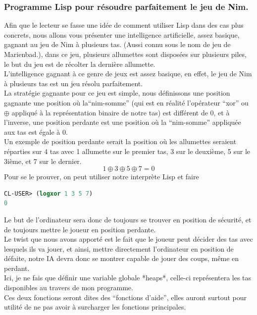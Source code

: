 \documentclass[a4paper, 12pt]{article}
\numberwithin{equation}{subsection}
\begin{document}
\subsubsection{Programme Lisp pour résoudre parfaitement le jeu de Nim.}
Afin que le lecteur se fasse une idée de comment utiliser Lisp dans des cas plus concrets, nous allons vous présenter une intelligence artificielle, assez basique, gagnant au jeu de Nim à plusieurs tas. (Aussi connu sous le nom de jeu de Marienbad.), dans ce jeu, plusieurs allumettes sont disposées sur plusieurs piles, le but du jeu est de récolter la dernière allumette. \\
L'intelligence gagnant à ce genre de jeux est assez basique, en effet, le jeu de Nim à plusieurs tas est un jeu résolu parfaitement. \\
La stratégie gagnante pour ce jeu est simple, nous définissons une position gagnante une position où la``nim-somme'' (qui est en réalité l'opérateur ``xor'' ou $\oplus$ appliqué à la représentation binaire de notre tas) est différent de 0, et à l'inverse, une position perdante est une position où la ``nim-somme'' appliquée aux tas est égale à 0. \\
Un exemple de position perdante serait la position où les allumettes seraient réparties sur 4 tas avec 1 allumette sur le premier tas, 3 sur le deuxième, 5 sur le 3ième, et 7 sur le dernier. \\
$$1 \oplus 3 \oplus 5 \oplus 7 = 0$$
Pour se le prouver, on peut utiliser notre interprète Lisp et faire
\begin{lstlisting}[language=Lisp]
CL-USER> (logxor 1 3 5 7)
0
\end{lstlisting}
Le but de l'ordinateur sera donc de toujours se trouver en position de sécurité, et de toujours mettre le joueur en position perdante. \\
Le twist que nous avons apporté est le fait que le joueur peut décider des tas avec lesquels ils va jouer, et ainsi, mettre directement l'ordinateur en position de défaite, notre IA devra donc se montrer capable de jouer des coups, même en perdant. \\

Ici, je ne fais que définir une variable globale *heaps*, celle-ci représentera les tas disponibles au travers de mon programme. \\

Ces deux fonctions seront dites des ``fonctions d'aide'', elles auront surtout pour utilité de ne pas avoir à surcharger les fonctions principales. \\
\end{document}
